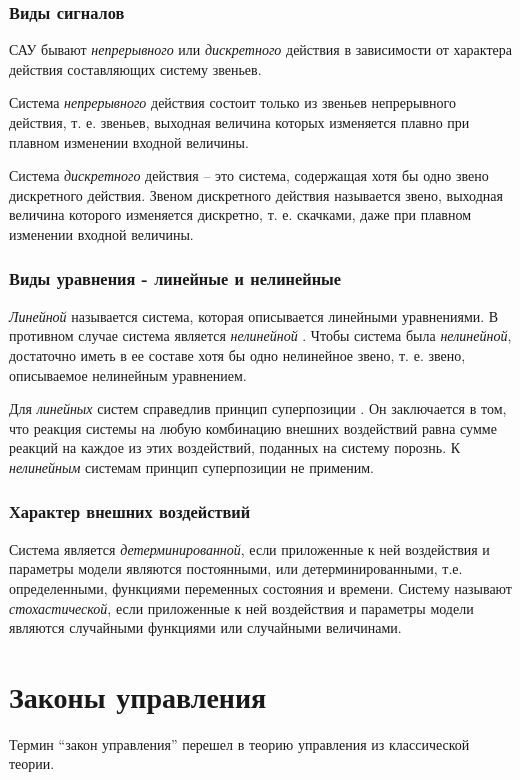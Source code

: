 \documentclass[TAU.tex]{subfiles}
\begin{document}
\subsubsection{Виды сигналов}

САУ бывают {\it непрерывного} или {\it дискретного} действия в зависимости от характера действия составляющих систему звеньев. \par
Система {\it непрерывного} действия состоит только из звеньев непрерывного действия, т. е. звеньев, выходная величина которых изменяется плавно при плавном изменении входной величины. \par
Система {\it дискретного}  действия – это система, содержащая хотя бы одно звено дискретного действия. Звеном дискретного действия называется звено, выходная величина которого изменяется дискретно, т. е. скачками, даже при плавном изменении входной величины.

\subsubsection{Виды уравнения - линейные и нелинейные}

{\it Линейной} называется система, которая описывается линейными уравнениями. В противном случае система является {\it нелинейной} . Чтобы система была {\it нелинейной}, достаточно иметь в ее составе хотя бы одно нелинейное звено, т. е. звено, описываемое нелинейным уравнением. \par
Для {\it линейных} систем справедлив принцип суперпозиции . Он заключается в том, что реакция системы на любую комбинацию внешних воздействий равна сумме реакций на каждое из этих воздействий, поданных на систему порознь. К {\it нелинейным} системам принцип суперпозиции не применим. 


\subsubsection{Характер внешних воздействий}

Система является {\it детерминированной}, если приложенные к ней воздействия и параметры модели являются постоянными, или детерминированными, т.е. определенными, функциями переменных состояния и времени. Систему называют {\it стохастической}, если приложенные к ней воздействия и параметры модели являются случайными функциями или случайными величинами.

\section{Законы управления}
Термин “закон управления” перешел в теорию управления из классической теории. 
\end{document}
